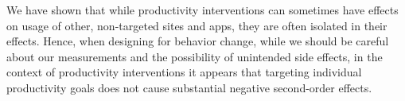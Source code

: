 We have shown that while productivity interventions can sometimes have effects on usage of other, non-targeted sites and apps, they are often isolated in their effects. Hence, when designing for behavior change, while we should be careful about our measurements and the possibility of unintended side effects, in the context of productivity interventions it appears that targeting individual productivity goals does not cause substantial negative second-order effects. %




